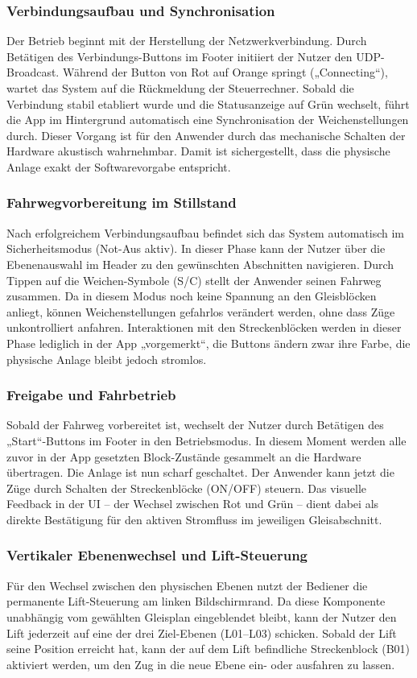 \documentclass{article}
\begin{document}
\subsubsection{Verbindungsaufbau und Synchronisation}
Der Betrieb beginnt mit der Herstellung der Netzwerkverbindung. Durch Betätigen des Verbindungs-Buttons im Footer initiiert der Nutzer den UDP-Broadcast. Während der Button von Rot auf Orange springt („Connecting“), wartet das System auf die Rückmeldung der Steuerrechner. Sobald die Verbindung stabil etabliert wurde und die Statusanzeige auf Grün wechselt, führt die App im Hintergrund automatisch eine Synchronisation der Weichenstellungen durch. Dieser Vorgang ist für den Anwender durch das mechanische Schalten der Hardware akustisch wahrnehmbar. Damit ist sichergestellt, dass die physische Anlage exakt der Softwarevorgabe entspricht.

\subsubsection{Fahrwegvorbereitung im Stillstand}
Nach erfolgreichem Verbindungsaufbau befindet sich das System automatisch im Sicherheitsmodus (Not-Aus aktiv). In dieser Phase kann der Nutzer über die Ebenenauswahl im Header zu den gewünschten Abschnitten navigieren. Durch Tippen auf die Weichen-Symbole (S/C) stellt der Anwender seinen Fahrweg zusammen. Da in diesem Modus noch keine Spannung an den Gleisblöcken anliegt, können Weichenstellungen gefahrlos verändert werden, ohne dass Züge unkontrolliert anfahren. Interaktionen mit den Streckenblöcken werden in dieser Phase lediglich in der App „vorgemerkt“, die Buttons ändern zwar ihre Farbe, die physische Anlage bleibt jedoch stromlos.

\subsubsection{Freigabe und Fahrbetrieb}
Sobald der Fahrweg vorbereitet ist, wechselt der Nutzer durch Betätigen des „Start“-Buttons im Footer in den Betriebsmodus. In diesem Moment werden alle zuvor in der App gesetzten Block-Zustände gesammelt an die Hardware übertragen. Die Anlage ist nun scharf geschaltet. Der Anwender kann jetzt die Züge durch Schalten der Streckenblöcke (ON/OFF) steuern. Das visuelle Feedback in der UI – der Wechsel zwischen Rot und Grün – dient dabei als direkte Bestätigung für den aktiven Stromfluss im jeweiligen Gleisabschnitt.

\subsubsection{Vertikaler Ebenenwechsel und Lift-Steuerung}
Für den Wechsel zwischen den physischen Ebenen nutzt der Bediener die permanente Lift-Steuerung am linken Bildschirmrand. Da diese Komponente unabhängig vom gewählten Gleisplan eingeblendet bleibt, kann der Nutzer den Lift jederzeit auf eine der drei Ziel-Ebenen (L01–L03) schicken. Sobald der Lift seine Position erreicht hat, kann der auf dem Lift befindliche Streckenblock (B01) aktiviert werden, um den Zug in die neue Ebene ein- oder ausfahren zu lassen.
\end{document}
